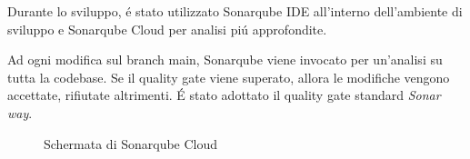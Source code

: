Durante lo sviluppo, é stato utilizzato Sonarqube IDE all'interno
dell'ambiente di sviluppo e Sonarqube Cloud per analisi piú approfondite.

Ad ogni modifica sul branch main, Sonarqube viene invocato per un'analisi
su tutta la codebase. Se il quality gate viene superato, allora le modifiche
vengono accettate, rifiutate altrimenti.
É stato adottato il quality gate standard \emph{Sonar way}.

\begin{figure}[H]
    \caption{Schermata di Sonarqube Cloud}
    \label{fig:Sonarqube Cloud}
\end{figure}